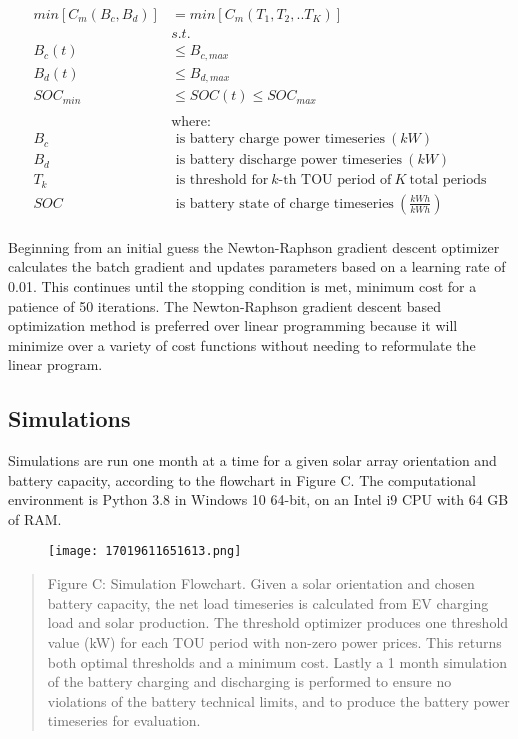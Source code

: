 \documentclass[
]{article}
\begin{document}
\begin{equation}
\begin{split}
min[C_m(B_c,B_d)] & = min[C_m(T_1,T_2,..T_K)] \\
& s.t. \\
B_c(t) & \le B_{c,max} \\
B_d(t) & \le B_{d,max} \\
SOC_{min} & \le SOC(t) \le SOC_{max} \\
\\
& \text{where:} \\
B_c & \text{ is battery charge power timeseries}\ (kW) \\
B_d & \text{ is battery discharge power timeseries}\ (kW) \\
T_k & \text{ is threshold for}\ k\text{-th TOU period of}\ K\ \text{total periods} \\
SOC & \text{ is battery state of charge timeseries}\ (\frac{kWh}{kWh}) \\
\end{split}
\end{equation}

Beginning from an initial guess the Newton-Raphson gradient descent
optimizer calculates the batch gradient and updates parameters based on
a learning rate of 0.01. This continues until the stopping condition is
met, minimum cost for a patience of 50 iterations. The Newton-Raphson
gradient descent based optimization method is preferred over linear
programming because it will minimize over a variety of cost functions
without needing to reformulate the linear program.

\hypertarget{simulations}{%
\subsection{Simulations}\label{simulations}}

Simulations are run one month at a time for a given solar array
orientation and battery capacity, according to the flowchart in Figure
C. The computational environment is Python 3.8 in Windows 10 64-bit, on
an Intel i9 CPU with 64 GB of RAM.

\begin{figure}
\centering
\texttt{[image: 17019611651613.png]}
\caption{}
\end{figure}

\begin{quote}
Figure C: Simulation Flowchart. Given a solar orientation and chosen
battery capacity, the net load timeseries is calculated from EV charging
load and solar production. The threshold optimizer produces one
threshold value (kW) for each TOU period with non-zero power prices.
This returns both optimal thresholds and a minimum cost. Lastly a 1
month simulation of the battery charging and discharging is performed to
ensure no violations of the battery technical limits, and to produce the
battery power timeseries for evaluation.
\end{quote}
\end{document}
